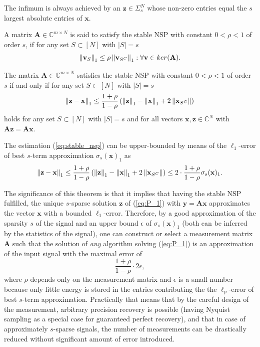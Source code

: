 \begin{remark}
The  infimum is always achieved by an $\mathbf{z} \in \Sigma_s^N$ whose non-zero entries equal the $s$ largest absolute entries of $\mathbf{x}$.
\end{remark}

\begin{definition}
A matrix $\mathbf{A} \in \mathbb{C}^{m \times N}$ is said to satisfy the stable NSP with constant $0 < \rho < 1$ of order $s$, if for any set $S \subset [N]$ with $|S| = s$
\[\left\lVert\mathbf{v}_S\right\rVert_1 \le \rho \left\lVert\mathbf{v}_{S^C}\right\rVert_1 : \forall \mathbf{v} \in ker(\mathbf{A}).\]
\end{definition}

\begin{theorem}
The matrix $\mathbf{A} \in \mathbb{C}^{m \times N}$ satisfies the stable NSP with constant $0 < \rho < 1$ of order $s$ if and only if for any set $S \subset [N]$ with $|S| = s$
\begin{equation}\label{eq:stable_nsp}
    \left\lVert\mathbf{z} - \mathbf{x}\right\rVert_1 \le \frac{1 + \rho}{1 - \rho} \left(\left\lVert\mathbf{z}\right\rVert_1 - \left\lVert\mathbf{x}\right\rVert_1 + 2\left\lVert\mathbf{x}_{S^C}\right\rVert\right)
\end{equation}
holds for any set $S \subset [N]$ with $|S| = s$ and for all vectors $\mathbf{x,z} \in \mathbb{C}^N$ with $\mathbf{Az} = \mathbf{Ax}$.
\end{theorem}

\begin{remark}
The estimation (\ref{eq:stable_nsp}) can be upper-bounded by means of the $\ell_1$-error of best $s$-term approximation $\sigma_s(\mathbf{x})_1$ as
\[\left\lVert\mathbf{z} - \mathbf{x}\right\rVert_1 \le \frac{1 + \rho}{1 - \rho} \left(\left\lVert\mathbf{z}\right\rVert_1 - \left\lVert\mathbf{x}\right\rVert_1 + 2\left\lVert\mathbf{x}_{S^C}\right\rVert\right) \le 2 \cdot \frac{1 + \rho}{1 - \rho}\sigma_s(\mathbf{x})_1.\]
\end{remark}

The significance of this theorem is that it implies that having the stable NSP fulfilled, the unique $s$-sparse solution $\mathbf{z}$ of (\ref{eq:P_1}) with $\mathbf{y} = \mathbf{Ax}$ approximates the vector $\mathbf{x}$ with a bounded $\ell_1$-error. Therefore, by a good approximation of the sparsity $s$ of the signal and an upper bound $\epsilon$ of $\sigma_s(\mathbf{x})_1$ (both can be inferred by the statistics of the signal), one can construct or select a measurement matrix $\mathbf{A}$ such that the solution of \textit{any} algorithm solving (\ref{eq:P_1}) is an approximation of the input signal with the maximal error of
\[\frac{1 + \rho}{1 - \rho} \cdot 2\epsilon,\]
where $\rho$ depends only on the measurement matrix and $\epsilon$ is a small number because only little energy is stored in the entries contributing the the $\ell_p$-error of best $s$-term approximation.
Practically that means that by the careful design of the measurement, arbitrary precision recovery is possible (having Nyquist sampling as a special case for guaranteed perfect recovery), and that in case of approximately $s$-sparse signals, the number of measurements can be drastically reduced without significant amount of error introduced.

